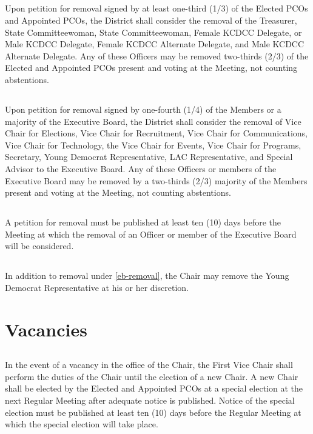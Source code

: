\subsection{}
Upon petition for removal signed by at least one-third (1/3) of the Elected PCOs and Appointed PCOs, the \fortythird{} District  shall consider the removal of the Treasurer, State Committeewoman, State Committeewoman, Female KCDCC Delegate, or Male KCDCC Delegate, Female KCDCC Alternate Delegate, and Male KCDCC Alternate Delegate. Any of these Officers may be removed two-thirds (2/3) of the Elected and Appointed PCOs present and voting at the Meeting, not counting abstentions.

\subsection{} \label{eb-removal}
Upon petition for removal signed by one-fourth (1/4) of the Members or a majority of the Executive Board, the \fortythird{} District  shall consider the removal of Vice Chair for Elections, Vice Chair for Recruitment, Vice Chair for Communications, Vice Chair for Technology, the Vice Chair for Events, Vice Chair for Programs, Secretary, Young Democrat Representative, LAC Representative, and Special Advisor to the Executive Board. Any of these Officers or members of the Executive Board may be removed by a two-thirds (2/3) majority of the Members present and voting at the Meeting, not counting abstentions.

\subsection{}
A petition for removal must be published at least ten (10) days before the Meeting at which the removal of an Officer or member of the Executive Board will be considered.

\subsection{}
In addition to removal under \autoref{eb-removal}, the Chair may remove the Young Democrat Representative at his or her discretion.

\section{Vacancies}
\subsection{}
In the event of a vacancy in the office of the Chair, the First Vice Chair shall perform the duties of the Chair until the election of a new Chair. A new Chair shall be elected by the Elected and Appointed PCOs at a special election at the next Regular Meeting after adequate notice is published. Notice of the special election must be published at least ten (10) days before the Regular Meeting at which the special election will take place.

